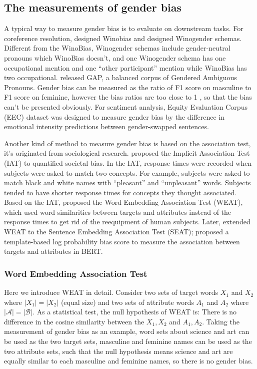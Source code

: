 \subsection{The measurements of gender bias}
A typical way to measure gender bias is to evaluate on downstream tasks. For coreference resolution, \citet{zhao2018gender} designed Winobias and \citet{rudinger2018gender} designed Winogender schemas. Different from the WinoBias, Winogender schemas include gender-neutral pronouns which WinoBias doesn't, and one Winogender schema has one occupational mention and one “other participant” mention while WinoBias has two occupational. \citet{webster2018mind} released GAP, a balanced corpus of Gendered Ambiguous Pronouns. Gender bias can be measured as the ratio of F1 score on masculine to F1 score on feminine, however the bias ratios are too close to 1 \citep{Chada_2019, Attree_2019}, so that the bias can't be presented obviously. For sentiment analysis, Equity Evaluation Corpus (EEC) dataset \citep{Kiritchenko_2018} was designed to measure gender bias by the difference in emotional intensity predictions between gender-swapped sentences.

Another kind of method to measure gender bias is based on the association test, it's originated from sociological research. \citet{greenwald1998measuring} proposed the Implicit Association Test (IAT) to quantified societal bias. In the IAT, response times were recorded when subjects were asked to match two concepts. For example, subjects were asked to match black and white names with “pleasant” and “unpleasant” words. Subjects tended to have shorter response times for concepts they thought associated. Based on the IAT, \citet{caliskan2017semantics} proposed the Word Embedding Association Test (WEAT), which used word similarities between targets and attributes instead of the response times to get rid of the reequipment of human subjects. Later, \citet{may2019measuring} extended WEAT to the Sentence Embedding Association Test (SEAT); \citet{kurita2019measuring} proposed a template-based log probability bias score to measure the association between targets and attributes in BERT.

\subsubsection{Word Embedding Association Test}
Here we introduce WEAT in detail. Consider two sets of target words $X_1$ and $X_2$ where $|X_1|=|X_2|$ (equal size) and two sets of attribute words $A_1$ and $A_2$ where $|\mathcal{A}|=|\mathcal{B}|$. As a statistical test, the null hypothesis of WEAT is: There is no difference in the cosine similarity between the $X_1,X_2$ and $
A_1,A_2$. Taking the measurement of gender bias as an example, word sets about science and art can be used as the two target sets, masculine and feminine names can be used as the two attribute sets, such that the null hypothesis means science and art are equally similar to each masculine and feminine names, so there is no gender bias.

